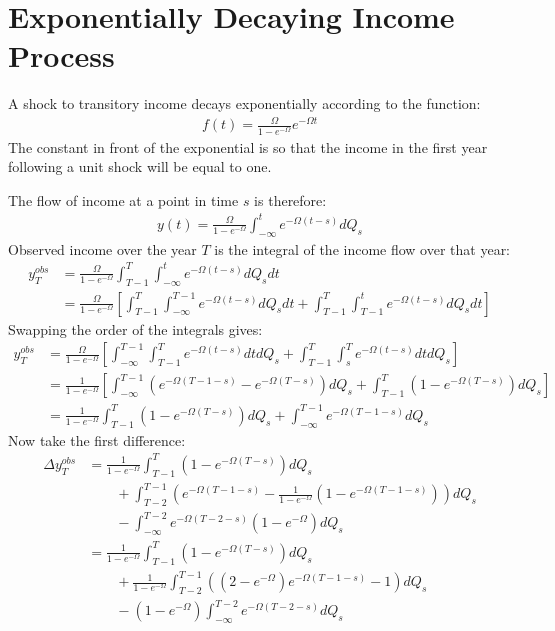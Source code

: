 \documentclass[12pt,pdftex,letterpaper]{article}
\begin{document}
	
\section{Exponentially Decaying Income Process}

A shock to transitory income decays exponentially according to the function:
\begin{align*}
	f(t) = \frac{\Omega}{1-e^{-\Omega}} e^{-\Omega t}
\end{align*}
The constant in front of the exponential is so that the income in the first year following a unit shock will be equal to one.

The flow of income at a point in time $s$ is therefore:
\begin{align*}
y(t) = \frac{\Omega}{1-e^{-\Omega}} \int_{-\infty}^{t} e^{-\Omega (t-s)}dQ_s
\end{align*}
Observed income over the year $T$ is the integral of the income flow over that year:
\begin{align*}
y_T^{obs} &=\frac{\Omega}{1-e^{-\Omega}} \int_{T-1}^{T} \int_{-\infty}^{t} e^{-\Omega (t-s)}dQ_s dt \\
&= \frac{\Omega}{1-e^{-\Omega}} \left[ \int_{T-1}^{T} \int_{-\infty}^{T-1} e^{-\Omega (t-s)}dQ_s dt + \int_{T-1}^{T} \int_{T-1}^{t} e^{-\Omega (t-s)}dQ_s dt \right] 
\end{align*}
Swapping the order of the integrals gives:
\begin{align*}
y_T^{obs} &=\frac{\Omega}{1-e^{-\Omega}} \left[ \int_{-\infty}^{T-1} \int_{T-1}^{T} e^{-\Omega (t-s)} dt dQ_s  + \int_{T-1}^{T} \int_{s}^{T} e^{-\Omega (t-s)} dt dQ_s \right] \\
&=\frac{1}{1-e^{-\Omega}} \left[ \int_{-\infty}^{T-1} ( e^{-\Omega (T-1-s)} - e^{-\Omega (T-s)}) dQ_s  + \int_{T-1}^{T}  ( 1 - e^{-\Omega (T-s)} ) dQ_s \right] \\
&= \frac{1}{1-e^{-\Omega}}\int_{T-1}^{T}  ( 1 - e^{-\Omega (T-s)} ) dQ_s  + \int_{-\infty}^{T-1}  e^{-\Omega (T-1-s)} dQ_s  
\end{align*}
Now take the first difference:
\begin{align*}
\Delta y_T^{obs} &=\frac{1}{1-e^{-\Omega}}\int_{T-1}^{T}  ( 1 - e^{-\Omega (T-s)} ) dQ_s \\ & \qquad + \int_{T-2}^{T-1} \left( e^{-\Omega (T-1-s)}   - \frac{1}{1-e^{-\Omega}}  ( 1 - e^{-\Omega (T-1-s)} ) \right) dQ_s \\
& \qquad - \int_{-\infty}^{T-2}  e^{-\Omega (T-2-s)} (1-e^{-\Omega}) dQ_s  \\
&=\frac{1}{1-e^{-\Omega}}\int_{T-1}^{T}  ( 1 - e^{-\Omega (T-s)} ) dQ_s \\ & \qquad +  \frac{1}{1-e^{-\Omega}} \int_{T-2}^{T-1}\left( (2-e^{-\Omega}) e^{-\Omega (T-1-s)} -1  \right)dQ_s \\
& \qquad -  (1-e^{-\Omega}) \int_{-\infty}^{T-2}  e^{-\Omega (T-2-s)} dQ_s 
\end{align*}
\end{document}

